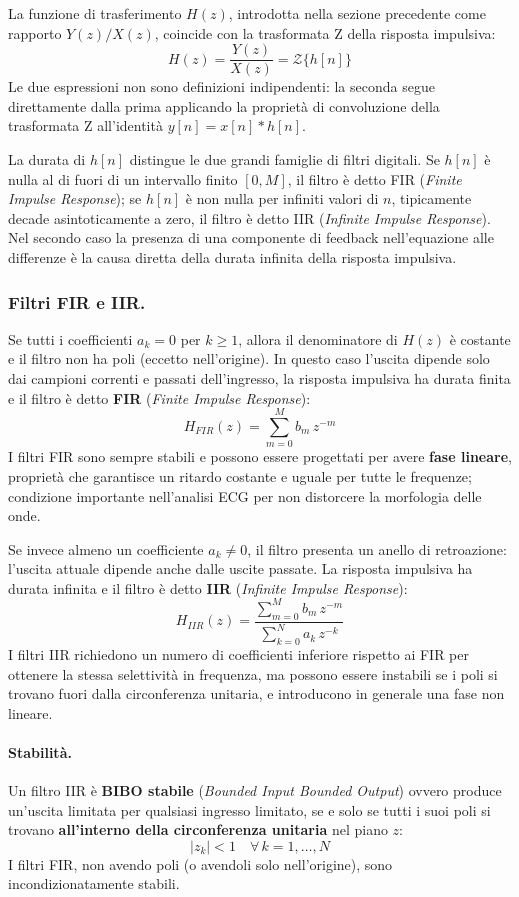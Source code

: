 La funzione di trasferimento $H(z)$, introdotta nella sezione precedente come rapporto $Y(z)/X(z)$, coincide con la trasformata Z della risposta impulsiva:
\[
H(z) = \frac{Y(z)}{X(z)} = \mathcal{Z}\{h[n]\}
\]
Le due espressioni non sono definizioni indipendenti: la seconda segue direttamente dalla prima applicando la proprietà di convoluzione della trasformata Z all'identità $y[n] = x[n] * h[n]$.

La durata di $h[n]$ distingue le due grandi famiglie di filtri digitali. Se $h[n]$ è nulla al di fuori di un intervallo finito $[0, M]$, il filtro è detto FIR (\textit{Finite Impulse Response}); se $h[n]$ è non nulla per infiniti valori di $n$, tipicamente decade asintoticamente a zero, il filtro è detto IIR (\textit{Infinite Impulse Response}). Nel secondo caso la presenza di una componente di feedback nell'equazione alle differenze è la causa diretta della durata infinita della risposta impulsiva.

\subsubsection{Filtri FIR e IIR.}
Se tutti i coefficienti $a_k = 0$ per $k \geq 1$, allora il denominatore di $H(z)$ è costante e il filtro non ha poli (eccetto nell'origine). In questo caso l'uscita dipende solo dai campioni correnti e passati dell'ingresso, la risposta impulsiva ha durata finita e il filtro è detto \textbf{FIR} (\textit{Finite Impulse Response}):
\[
H_{FIR}(z) = \sum_{m=0}^{M} b_m\, z^{-m}
\]
I filtri FIR sono sempre stabili e possono essere progettati per avere \textbf{fase lineare}, proprietà che garantisce un ritardo costante e uguale per tutte le frequenze; condizione importante nell'analisi ECG per non distorcere la morfologia delle onde.

Se invece almeno un coefficiente $a_k \neq 0$, il filtro presenta un anello di retroazione: l'uscita attuale dipende anche dalle uscite passate. La risposta impulsiva ha durata infinita e il filtro è detto \textbf{IIR} (\textit{Infinite Impulse Response}):
\[
H_{IIR}(z) = \frac{\displaystyle\sum_{m=0}^{M} b_m\, z^{-m}}
{\displaystyle\sum_{k=0}^{N} a_k\, z^{-k}}
\]
I filtri IIR richiedono un numero di coefficienti inferiore rispetto ai FIR per ottenere la stessa selettività in frequenza, ma possono essere instabili se i poli si trovano fuori dalla circonferenza unitaria, e introducono in generale una fase non lineare.

\paragraph{Stabilità.}
Un filtro IIR è \textbf{BIBO stabile} (\textit{Bounded Input Bounded Output}) ovvero produce un'uscita limitata per qualsiasi ingresso limitato, se e solo se tutti i suoi poli si trovano \textbf{all'interno della circonferenza unitaria} nel piano $z$:
\[
|z_k| < 1 \quad \forall\, k = 1, \ldots, N
\]
I filtri FIR, non avendo poli (o avendoli solo nell'origine), sono incondizionatamente stabili.

